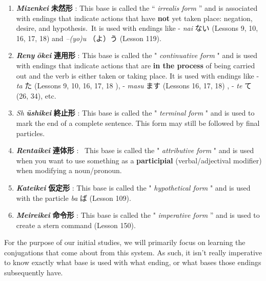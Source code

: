 \begin{enumerate}

\item \textbf{\emph{Mizenkei } }\textbf{未然形 }: This base is called the “ \emph{irrealis form }” and is associated with endings that indicate actions that have \textbf{not }yet taken place: negation, desire, and hypothesis. It is used with endings like - \emph{nai }ない (Lessons 9, 10, 16, 17, 18) and \emph{–(yo)u }（よ）う (Lesson 119). \hfill\break
\hfill\break

\item \textbf{\emph{Ren\textquotesingle y }}\textbf{\emph{ōkei }}\textbf{連用形 }: This base is called the " \emph{continuative form }" and is used with endings that indicate actions that are \textbf{in the process }of being carried out and the verb is either taken or taking place. It is used with endings like - \emph{ta }た (Lessons 9, 10, 16, 17, 18 ), - \emph{masu }ます (Lessons 16, 17, 18) , - \emph{te }て (26, 34), etc. \hfill\break
\textbf{\emph{\hfill\break
}}
\item \emph{Sh }\textbf{\emph{ūshikei }}\textbf{終止形 }: This base is called the " \emph{terminal form }" and is used to mark the end of a complete sentence. This form may still be followed by final particles. \hfill\break
\hfill\break

\item \textbf{\emph{Rentaikei }}\textbf{連体形 }:  This base is called the " \emph{attributive form }" and is used when you want to use something as a \textbf{participial }(verbal\slash adjectival modifier) when modifying a noun\slash pronoun. \hfill\break
\hfill\break

\item \textbf{\emph{Kateikei }}\textbf{仮定形 }: This base is called the " \emph{hypothetical form }" and is used with the particle \emph{ba }ば (Lesson 109). \hfill\break
\hfill\break

\item \textbf{\emph{Meireikei } }\textbf{命令形 }: This base is called the " \emph{imperative form }” and is used to create a stern command (Lesson 150). 
\end{enumerate}

\par{ For the purpose of our initial studies, we will primarily focus on learning the conjugations that come about from this system. As such, it isn't really imperative to know exactly what base is used with what ending, or what bases those endings subsequently have. }

